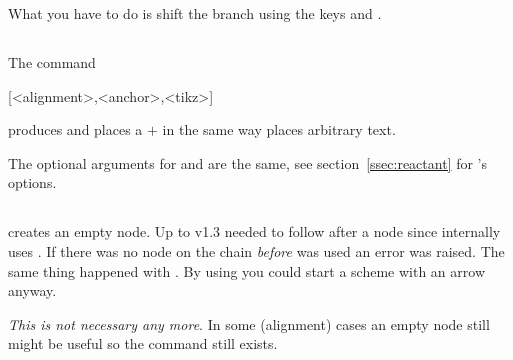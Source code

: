 \documentclass[toc=index,DIV10]{cnpkgdoc}
\begin{document}
What you have to do is shift the branch using the \TikZ keys  and
.
\begin{beispiel}
 \makevisible
 \begin{rxn}
  \arrow{}{}
 \end{rxn}
\end{beispiel}

\subsection{}\label{ssec:chemand}
The command
\begin{beschreibung}
 [<alignment>,<anchor>,<tikz>]
\end{beschreibung}
produces and places a $+$ in the same way  places arbitrary text.
\begin{beispiel}
 \begin{rxn}
  \chemand
  \chemand
 \end{rxn}
\end{beispiel}
The optional arguments for  and  are the same, see
section~\ref{ssec:reactant} for 's options.

\subsection{}\label{ssec:dummy}
 creates an empty node. Up to v1.3  needed to follow after
a node since  internally uses . If there was
no node on the chain \emph{before}  was used an error was raised.
The same thing happened with . By using  you could start
a scheme with an arrow anyway.
\begin{beispiel}
 \begin{rxn}
  \dummy\arrow{}{}
 \end{rxn}
\end{beispiel}
\emph{This is \emph{not} necessary any more}. In some (alignment) cases an empty
node still might be useful so the command still exists.
\end{document}
